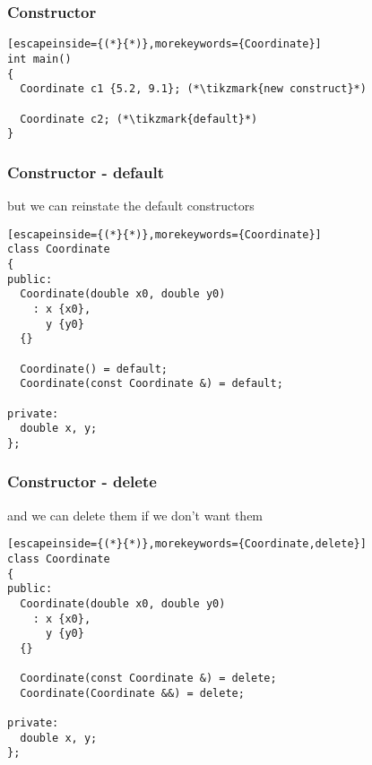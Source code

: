 \documentclass[14pt,a4paper,dvipsnames,usenames]{beamer}
\begin{document}
\begin{frame}[fragile]
  \frametitle{Constructor}

  \begin{lstlisting}[escapeinside={(*}{*)},morekeywords={Coordinate}]
int main()
{
  Coordinate c1 {5.2, 9.1}; (*\tikzmark{new construct}*)

  Coordinate c2; (*\tikzmark{default}*)
}
  \end{lstlisting}

  \nointerlineskip

\end{frame}

\begin{frame}[fragile]
  \frametitle{Constructor - default}

  but we can reinstate the default constructors

  \begin{lstlisting}[escapeinside={(*}{*)},morekeywords={Coordinate}]
class Coordinate
{
public:
  Coordinate(double x0, double y0)
    : x {x0},
      y {y0}
  {}

  Coordinate() = default;
  Coordinate(const Coordinate &) = default;

private:
  double x, y;
};
  \end{lstlisting}


  \CPPEleven

\end{frame}

\begin{frame}[fragile]
  \frametitle{Constructor - delete}

  and we can delete them if we don't want them

  \begin{lstlisting}[escapeinside={(*}{*)},morekeywords={Coordinate,delete}]
class Coordinate
{
public:
  Coordinate(double x0, double y0)
    : x {x0},
      y {y0}
  {}

  Coordinate(const Coordinate &) = delete;
  Coordinate(Coordinate &&) = delete;

private:
  double x, y;
};
  \end{lstlisting}

  \CPPEleven

\end{frame}
\end{document}
